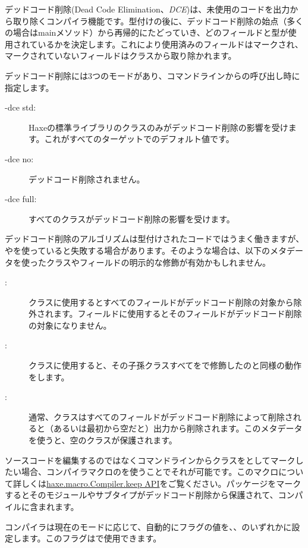 デッドコード削除(Dead Code Elimination、\emph{DCE})は、未使用のコードを出力から取り除くコンパイラ機能です。型付けの後に、デッドコード削除の始点（多くの場合はmainメソッド）から再帰的にたどっていき、どのフィールドと型が使用されているかを決定します。これにより使用済みのフィールドはマークされ、マークされていないフィールドはクラスから取り除かれます。

デッドコード削除には3つのモードがあり、コマンドラインからの呼び出し時に指定します。

\begin{description}
	\item[-dce std:] Haxeの標準ライブラリのクラスのみがデッドコード削除の影響を受けます。これがすべてのターゲットでのデフォルト値です。
	\item[-dce no:] デッドコード削除されません。
	\item[-dce full:] すべてのクラスがデッドコード削除の影響を受けます。
\end{description}
デッドコード削除のアルゴリズムは型付けされたコードではうまく働きますが、やを使っていると失敗する場合があります。そのような場合は、以下のメタデータを使ったクラスやフィールドの明示的な修飾が有効かもしれません。

\begin{description}
	\item[:] クラスに使用するとすべてのフィールドがデッドコード削除の対象から除外されます。フィールドに使用するとそのフィールドがデッドコード削除の対象になりません。
	\item[:] クラスに使用すると、その子孫クラスすべてをで修飾したのと同様の動作をします。
	\item[:] 通常、クラスはすべてのフィールドがデッドコード削除によって削除されると（あるいは最初から空だと）出力から削除されます。このメタデータを使うと、空のクラスが保護されます。
\end{description}

ソースコードを編集するのではなくコマンドラインからクラスをとしてマークしたい場合、コンパイラマクロのを使うことでそれが可能です。このマクロについて詳しくは\href{http://api.haxe.org/haxe/macro/Compiler.html#keep}{haxe.macro.Compiler.keep API}をご覧ください。パッケージをマークするとそのモジュールやサブタイプがデッドコード削除から保護されて、コンパイルに含まれます。

コンパイラは現在のモードに応じて、自動的にフラグの値を、、のいずれかに設定します。このフラグはで使用できます。

